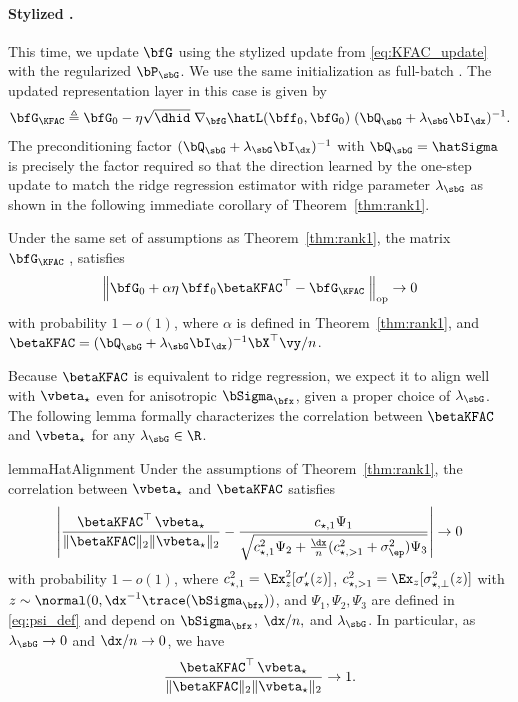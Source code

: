 \paragraph{Stylized \KFAC.} This time, we update $\bfG$ using the stylized \KFAC  update from \eqref{eq:KFAC_update} with the regularized $\bP_\sbG$. We use the same initialization as full-batch \SGD. The updated representation layer in this case is given by 
\begin{align*}
    \bfG_{\KFAC } \triangleq \bfG_0  - \eta \sqrt{\dhid} \; \nabla_\bfG \hatL(\bff_0, \bfG_0)\; (\bQ_{\sbG}+\lambda_\sbG \bI_{\dx})^{-1}.
\end{align*}
The preconditioning factor $(\bQ_{\sbG}+\lambda_\sbG \bI_{\dx})^{-1}$ with $\bQ_{\sbG} = \hatSigma$ is precisely the factor required so that the direction learned by the one-step update to match the ridge regression estimator with ridge parameter $\lambda_\sbG$ as shown in the following immediate corollary of Theorem~\ref{thm:rank1}.
\begin{corollary}
    \label{corr:rank1}
    Under the same set of assumptions as Theorem~\ref{thm:rank1},
    the matrix $\bfG_{\textup{\KFAC }}$, satisfies
    \begin{align*}
        \left\|\bfG_0 + {\alpha \eta}\, \bff_0  \betaKFAC^\top - \bfG_{\textup{\KFAC }}\right\|_{\rm op} \to 0
    \end{align*}
      with probability $1 - o(1)$, where $\alpha$ is defined in Theorem~\ref{thm:rank1}, and 
    $\betaKFAC =  (\bQ_{\sbG}+\lambda_\sbG \bI_{\dx})^{-1}\bX^\top \vy/n$.
\end{corollary}
Because $\betaKFAC$ is equivalent to ridge regression, we expect it to align well with $\vbeta_\star$ even for anisotropic $\bSigma_{\bfx}$, given a proper choice of $\lambda_{\sbG}$.  The following lemma formally characterizes the correlation between $\betaKFAC$ and $\vbeta_\star$ for any $\lambda_{\sbG}\in \R$.

\begin{restatable}{lemma}{HatAlignment}
    \label{lemma:beta_hat_alignment}
    Under the assumptions of Theorem~\ref{thm:rank1}, the correlation between $\vbeta_\star$ and $\betaKFAC$ satisfies
    \begin{align*}
        \left|\frac{\betaKFAC^\top \, \vbeta_\star}{\|\betaKFAC\|_2  \|\vbeta_\star\|_2}  - \frac{c_{\star,1} \Psi_1}{\sqrt{c_{\star,1}^2 \Psi_2 + \frac{\dx}{n} (c_{\star, >1}^2 + \sigma_\ep^2)\Psi_3}}\right| \to 0
    \end{align*}
     with probability $1 - o(1)$, where  $c^2_{\star, 1} = \Ex_{z}^2 [\sigma_{\star}'(z)]$, $c_{\star, >1}^2 = \Ex_{z}[\sigma_{\star, \perp}^2(z)]$ with $z \sim \normal(0, \dx^{-1}\trace(\bSigma_\bfx))$, and  $\Psi_1, \Psi_2, \Psi_3$ are defined in \eqref{eq:psi_def} and depend on $\bSigma_\bfx$, ${\dx}/{n},$ and $\lambda_{\sbG}$. In particular, as $\lambda_{\sbG} \to 0$ and $\dx/n \to 0$, we have
     \begin{align*}
          \frac{\betaKFAC^\top \, \vbeta_\star}{\|\betaKFAC\|_2  \|\vbeta_\star\|_2} \to 1.
     \end{align*}
\end{restatable}

